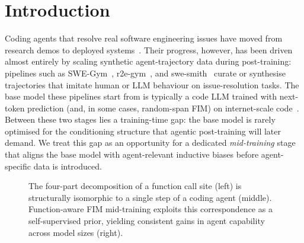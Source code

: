 \section{Introduction}
\label{sec:intro}

Coding agents that resolve real software engineering issues have moved from
research demos to deployed systems~\citep{TODO_swebench, TODO_sweagent,
TODO_openhands}. Their progress, however, has been driven almost entirely by
scaling synthetic agent-trajectory data during post-training: pipelines such
as SWE-Gym~\citep{TODO_swegym}, r2e-gym~\citep{TODO_r2egym}, and
swe-smith~\citep{TODO_swesmith} curate or synthesise trajectories that
imitate human or LLM behaviour on issue-resolution tasks. The base model
these pipelines start from is typically a code LLM trained with next-token
prediction (and, in some cases, random-span FIM) on internet-scale
code~\citep{TODO_qwen_coder, TODO_deepseek_coder, TODO_starcoder}. Between
these two stages lies a training-time gap: the base model is rarely
optimised for the conditioning structure that agentic post-training will
later demand. We treat this gap as an opportunity for a dedicated
\emph{mid-training} stage that aligns the base model with agent-relevant
inductive biases before agent-specific data is introduced.

\begin{figure}[ht]
\centering
\caption{The four-part decomposition of a function call site (left) is
structurally isomorphic to a single step of a coding agent (middle).
Function-aware FIM mid-training exploits this correspondence as a
self-supervised prior, yielding consistent gains in agent capability across
model sizes (right).}
\label{fig:teaser}
\end{figure}

